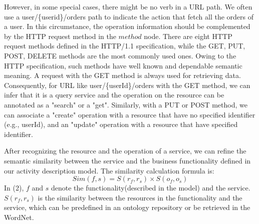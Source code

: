 However, in some special cases, there might be no verb in a URL path. We often use a user/\{userid\}/orders  path to indicate the action that fetch all the orders of a user. In this circumstance, the operation information should be complemented by the HTTP request method in the $method$ node. There are eight HTTP request methods defined in the HTTP/1.1 specification, while the GET, PUT, POST, DELETE methods are the most commonly used ones. Owing to the HTTP specification, such methods have well known and dependable semantic meaning. A request with the GET method is always used for retrieving data. Consequently, for URL like user/\{userId\}/orders with the GET method, we can infer that it is a query service and the operation on the resource can be annotated as a "search" or a "get". Similarly, with a PUT or POST method, we can associate a "create" operation with a resource that have no specified identifier (e.g., userId), and an "update" operation with a resource that have specified identifier. 

After recognizing the resource and the operation of a service, we can refine the semantic similarity between the service and the business functionality defined in our activity description model. The similarity calculation formula is:
\begin{equation}
	Sim(f,s) = S(r_f,r_s) \times S(o_f,o_s)
\end{equation}
In (2), $f$ and $s$ denote the functionality(described in the model) and the service. $S(r_f,r_s)$ is the similarity between the resources in the functionality and the service, which can be predefined in an ontology repository or be retrieved in the WordNet. 

